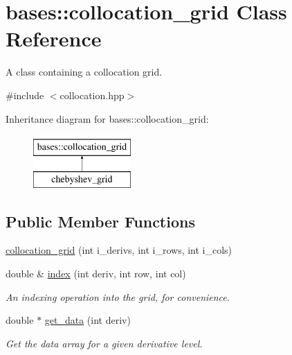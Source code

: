 \hypertarget{classbases_1_1collocation__grid}{\section{bases\-:\-:collocation\-\_\-grid Class Reference}
\label{classbases_1_1collocation__grid}
}


A class containing a collocation grid.  




{\ttfamily \#include $<$collocation.\-hpp$>$}

Inheritance diagram for bases\-:\-:collocation\-\_\-grid\-:\begin{figure}[H]
\begin{center}
\leavevmode
\includegraphics[height=2.000000cm]{classbases_1_1collocation__grid}
\end{center}
\end{figure}
\subsection*{Public Member Functions}
\begin{DoxyCompactItemize}
\item 
\hyperlink{classbases_1_1collocation__grid_a1413d667a9604794f460c5fd510d0cd4}{collocation\-\_\-grid} (int i\-\_\-derivs, int i\-\_\-rows, int i\-\_\-cols)
\item 
double \& \hyperlink{classbases_1_1collocation__grid_a61c927792d21388e43d077158b941de9}{index} (int deriv, int row, int col)
\begin{DoxyCompactList}\small\item\em An indexing operation into the grid, for convenience. \end{DoxyCompactList}\item 
double $\ast$ \hyperlink{classbases_1_1collocation__grid_a79757d7c1c12eacdbecf4c48ae67ef11}{get\-\_\-data} (int deriv)
\begin{DoxyCompactList}\small\item\em Get the data array for a given derivative level. \end{DoxyCompactList}\end{DoxyCompactItemize}
